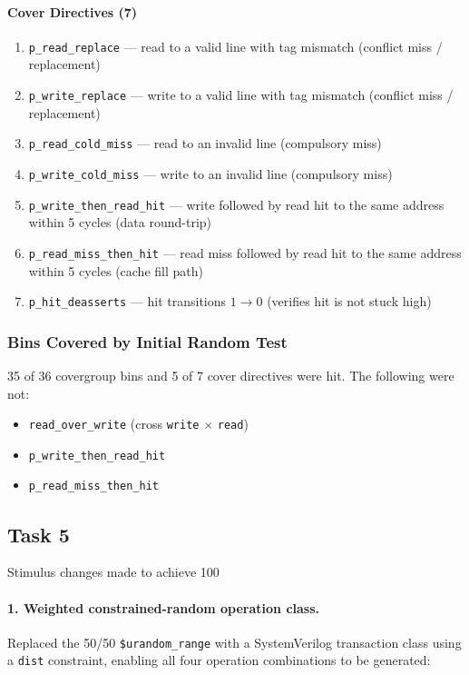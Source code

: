 \documentclass[11pt]{article}
\begin{document}
\paragraph*{Cover Directives (7)}
\begin{enumerate}[label={D\arabic*.}]
  \item \texttt{p\_read\_replace} --- read to a valid line with tag mismatch (conflict miss / replacement)
  \item \texttt{p\_write\_replace} --- write to a valid line with tag mismatch (conflict miss / replacement)
  \item \texttt{p\_read\_cold\_miss} --- read to an invalid line (compulsory miss)
  \item \texttt{p\_write\_cold\_miss} --- write to an invalid line (compulsory miss)
  \item \texttt{p\_write\_then\_read\_hit} --- write followed by read hit to the same address within 5 cycles (data round-trip)
  \item \texttt{p\_read\_miss\_then\_hit} --- read miss followed by read hit to the same address within 5 cycles (cache fill path)
  \item \texttt{p\_hit\_deasserts} --- hit transitions $1 \rightarrow 0$ (verifies hit is not stuck high)
\end{enumerate}

\subsubsection*{Bins Covered by Initial Random Test}

35 of 36 covergroup bins and 5 of 7 cover directives were hit. The following were not:

\begin{itemize}
  \item \texttt{read\_over\_write} (cross \texttt{write} $\times$ \texttt{read})
  \item \texttt{p\_write\_then\_read\_hit}
  \item \texttt{p\_read\_miss\_then\_hit}
\end{itemize}


\subsection*{Task 5}

Stimulus changes made to achieve 100%

\paragraph*{1. Weighted constrained-random operation class.}
Replaced the 50/50 \texttt{\$urandom\_range} with a SystemVerilog transaction class using a \texttt{dist} constraint, enabling all four operation combinations to be generated:
\end{document}
